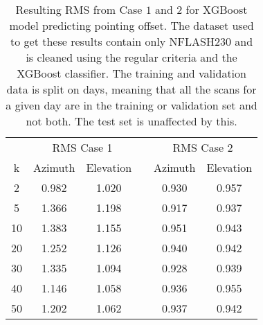 \begin{table}[h]
    \centering %
    \caption{Resulting RMS from Case $1$ and $2$ for XGBoost model predicting pointing offset.
    The dataset used to get these results contain only NFLASH230 and is cleaned using the regular criteria and the XGBoost classifier.
    The training and validation data is split on days, meaning that all the scans for a given day
    are in the training or validation set and not both. The test set is unaffected by this.}
    \begin{tabular}{ccc c cc}
        \toprule
        \multicolumn{1}{c}{} & \multicolumn{2}{c}{RMS Case 1} & & \multicolumn{2}{c}{RMS Case 2} \\
        \cmidrule(lr){2-3} \cmidrule(lr){5-6}
         k & Azimuth & Elevation & & Azimuth & Elevation \\
        \midrule
        2 &  0.982 &  1.020 & &  0.930 &  0.957 \\
        5 &  1.366 &  1.198 & &  0.917 &  0.937 \\
       10 &  1.383 &  1.155 & &  0.951 &  0.943 \\
       20 &  1.252 &  1.126 & &  0.940 &  0.942 \\
       30 &  1.335 &  1.094 & &  0.928 &  0.939 \\
       40 &  1.146 &  1.058 & &  0.936 &  0.955 \\
       50 &  1.202 &  1.062 & &  0.937 &  0.942 \\
        \bottomrule
    \end{tabular}
    \label{tab:results_nflash_days}
\end{table}



